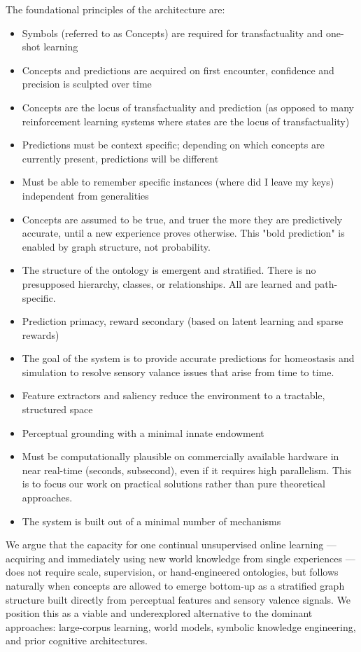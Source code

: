 \documentclass{article}
\begin{document}
The foundational principles of the architecture are:
\begin{itemize}
    \item Symbols (referred to as Concepts) are required for transfactuality and one-shot learning
    \item Concepts and predictions are acquired on first encounter, confidence and precision is sculpted over time
    \item Concepts are the locus of transfactuality and prediction (as opposed to many reinforcement learning systems where states are the locus of transfactuality)
    \item Predictions must be context specific; depending on which concepts are currently present, predictions will be different
    \item Must be able to remember specific instances (where did I leave my keys) independent from generalities
    \item Concepts are assumed to be true, and truer the more they are predictively accurate, until a new experience proves otherwise. This "bold prediction" is enabled by graph structure, not probability.
    \item The structure of the ontology is emergent and stratified. There is no presupposed hierarchy, classes, or relationships. All are learned and path-specific.
    \item Prediction primacy, reward secondary (based on latent learning and sparse rewards)
    \item The goal of the system is to provide accurate predictions for homeostasis and simulation to resolve sensory valance issues that arise from time to time.
    \item Feature extractors and saliency reduce the environment to a tractable, structured space
    \item Perceptual grounding with a minimal innate endowment
    \item Must be computationally plausible on commercially available hardware in near real-time (seconds, subsecond), even if it requires high parallelism. This is to focus our work on practical solutions rather than pure theoretical approaches.
    \item The system is built out of a minimal number of mechanisms
\end{itemize}

We argue that the capacity for one continual unsupervised online learning — acquiring and immediately using new world knowledge from single experiences — does not require scale, supervision, or hand-engineered ontologies, but follows naturally when concepts are allowed to emerge bottom-up as a stratified graph structure built directly from perceptual features and sensory valence signals. We position this as a viable and underexplored alternative to the dominant approaches: large-corpus learning, world models, symbolic knowledge engineering, and prior cognitive architectures.
\end{document}
